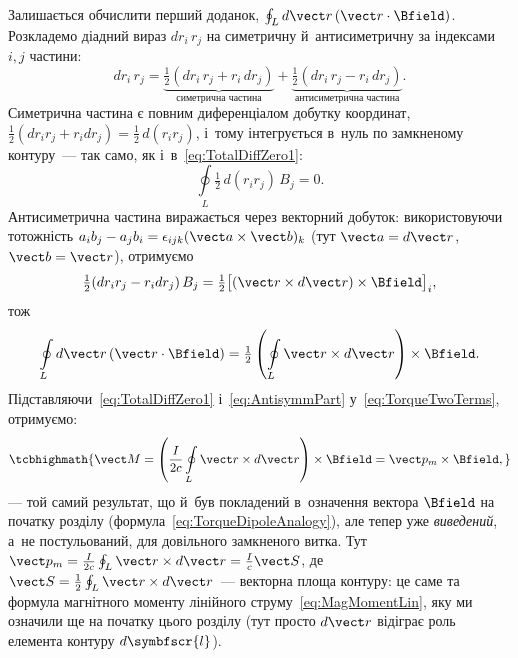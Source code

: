 Залишається обчислити перший доданок, $\oint_L d\vect r\,(\vect r\cdot\Bfield)$.
Розкладемо діадний вираз $dr_i\,r_j$ на симетричну й~антисиметричну за індексами $i,j$
частини:
\begin{equation*}
	dr_i\, r_j = \underbrace{\tfrac12(dr_i\,r_j + r_i\,dr_j)}_{\text{симетрична частина}} + \underbrace{\tfrac12(dr_i\,r_j - r_i\,dr_j)}_{\text{антисиметрична частина}}.
\end{equation*}
Симетрична частина є повним диференціалом добутку координат, $\tfrac12(dr_i r_j+r_i
	dr_j)=\tfrac12\,d(r_ir_j)$, і~тому інтегрується в~нуль по замкненому контуру~--- так само,
як і~в~\eqref{eq:TotalDiffZero1}:
\begin{equation*}
	\oint\limits_L \tfrac12\,d(r_i r_j)\,B_j = 0.
\end{equation*}
Антисиметрична частина виражається через векторний добуток: використовуючи тотожність
$a_i b_j - a_j b_i = \epsilon_{ijk}(\vect a\times\vect b)_k$ (тут $\vect a=d\vect r$, $\vect b=\vect r$), отримуємо
\begin{equation*}
	\tfrac12(dr_i r_j - r_i dr_j)\,B_j = \tfrac12\bigl[(\vect r\times d\vect r)\times\Bfield\bigr]_i,
\end{equation*}
тож
%
\begin{equation}\label{eq:AntisymmPart}
	\oint\limits_L d\vect r\,(\vect r\cdot\Bfield) = \tfrac12\left(\oint\limits_L\vect r\times d\vect r\right)\times\Bfield.
\end{equation}
%
Підставляючи~\eqref{eq:TotalDiffZero1} і~\eqref{eq:AntisymmPart}
у~\eqref{eq:TorqueTwoTerms}, отримуємо:
\begin{equation}\label{eq:TorqueLoop}
	\tcbhighmath{
		\vect M = \left(\frac{I}{2c}\oint\limits_L \vect r\times d\vect r\right)\times\Bfield = \vect p_m\times\Bfield,
	}
\end{equation}
--- той самий результат, що й~був покладений в~означення вектора $\Bfield$ на початку
розділу (формула~\eqref{eq:TorqueDipoleAnalogy}), але тепер уже \emph{виведений}, а~не
постульований, для довільного замкненого витка. Тут $\vect p_m =
	\frac{I}{2c}\oint_L\vect r\times d\vect r = \frac{I}{c}\vect S$, де $\vect
	S=\frac12\oint_L\vect r\times d\vect r$~--- векторна площа контуру: це саме та формула
магнітного моменту лінійного струму~\eqref{eq:MagMomentLin}, яку ми означили ще на початку
цього розділу (тут просто $d\vect r$ відіграє роль елемента контуру $d\symbfscr{l}$).


